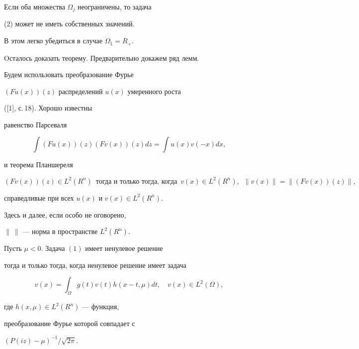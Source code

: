 Если оба множества $\Omega_{j}$ неограничены, то задача


(2) может не иметь собственных значений.


В этом легко убедиться в случае $\Omega_{1} = R_{+}$.





Oсталось доказать теорему. Предварительно докажем ряд лемм.


Будем использовать преобразование Фурье


$(Fu(x))(z)$ распределений $u(x)$ умеренного роста


([1], с.\,18). Хорошо известны


равенство Парсеваля


$$


\int (Fu(x))(z) (Fv(x))(z) dz =


\int u(x) v(-x) dx,


$$


и теорема Планшереля


$$


(Fv(x))(z) \in L^{2}{(R^{n})} \ \;


\text{тогда и только тогда, когда}


\ \; v(x) \in L^{2}{(R^{n})}, \ \;


\| v(x) \| = \| (Fv(x))(z) \|,


$$


справедливые при всех $u(x)$ и $v(x) \in L^{2}{(R^{n})}$.





Здесь и далее, если особо не оговорено,


$\| \ \|$ --- норма в пространстве $L^{2}{(R^{n})}$.





\begin{lem}


Пусть $\mu < 0$. Задача $(1)$ имеет ненулевое решение


тогда и только тогда, когда ненулевое решение имеет задача


\begin{equation}


v(x)= \int_{\Omega} g(t) v(t) h(x-t,\mu) dt,\quad


v(x) \in L^{2}{(\Omega )},


\end{equation}


где $h(x,\mu) \in L^{2}{(R^{n})}$ --- функция, 


преобразование Фурье которой совпадает с


$(P(iz)-\mu)^{-1}/\sqrt{2\pi}$.


\end{lem}





